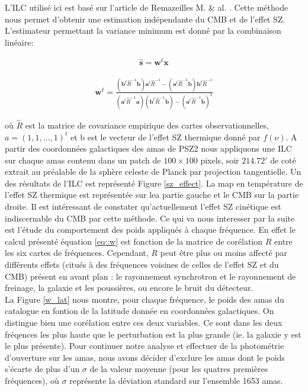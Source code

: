\documentclass[a4paper,11pt]{article}
\begin{document}
L'ILC utilisé ici est basé sur l'article de Remazeilles M. \&
al. \cite{Remazeilles}. Cette méthode nous permet d'obtenir  une
estimation indépendante du CMB et de l'effet SZ. L'estimateur
permettant la variance minimum est donné par la combinaison linéaire: 

\begin{align*}
  \widehat{\textbf{s}} = \textbf{w}^t \textbf{x}
\end{align*}

\begin{align}
  \label{eq::w}
  \textbf{w}^t = \frac{\left( \textbf{b}^t\widehat{R}^{-1} \textbf{b}
    \right) \textbf{a}^t \widehat{R}^{-1} - \left( \textbf{a}^t\widehat{R}^{-1} \textbf{b}
    \right) \textbf{b}^t \widehat{R}^{-1}}{\left( \textbf{a}^t\widehat{R}^{-1} \textbf{a}
    \right) \left( \textbf{b}^t\widehat{R}^{-1} \textbf{b}
    \right) - \left( \textbf{a}^t\widehat{R}^{-1} \textbf{b}
    \right)^2}
\end{align}

où $\widehat{R}$ est la matrice de covariance empirique des cartes
observationnelles, $a = (1, 1, ..., 1)^t$ et b est le vecteur de
l'effet SZ thermique donné par $f(\nu)$. A partir des coordonnées
galactiques des amas de PSZ2 nous appliquons une ILC sur chaque amas
contenu dans un patch de $100 \times 100$ pixels, soir $214.72 '$ de
coté extrait au préalable de la sphère celeste de Planck par
projection tangentielle. 
Un des résultats de l'ILC est représenté Figure \ref{sz_effect}. La
map en température de l'effet SZ thermique est représentée sur lea
partie gauche et le CMB sur la partie droite. Il est intéressant de
constater qu'actuellement l'effet SZ cinétique est indiscernable du
CMB par cette méthode.  
Ce qui va nous interesser par la suite est l'étude du comportement des
poids appliqués à chaque fréquence. En effet le calcul présenté
équation \eqref{eq::w} est fonction de la matrice de corélation $R$ entre
les six cartes de fréquences. Cependant, $R$ peut être plus ou moins affecté par
différents effets (citués à des fréquences voisines de celles de l'effet SZ et
du CMB) présent en avant plan : le rayonnement synchrotron et le
rayonnement de freinage, la galaxie et les poussières, ou encore le bruit du
détecteur.  \\

La Figure \ref{w_lat} nous montre, pour chaque fréquence, le poids
des amas du catalogue en fontion de la latitude donnée en coordonnées
galactiques. On distingue bien une corélation entre ces deux
variables. Ce sont dans les deux fréqences les plus haute que le
perturbation est la plus grande (ie. la galaxie y est le plus
présente). Pour continuer notre analyse et effectuer de la photométrie
d'ouverture sur les amas, nous avons décider d'exclure les amas dont
le poids s'écarte de plus d'un $\sigma$ de la valeur moyenne (pour les
quatres premières fréquences), où $\sigma$ représente la déviation
standard sur l'ensemble 1653 amas. \\
\end{document}
